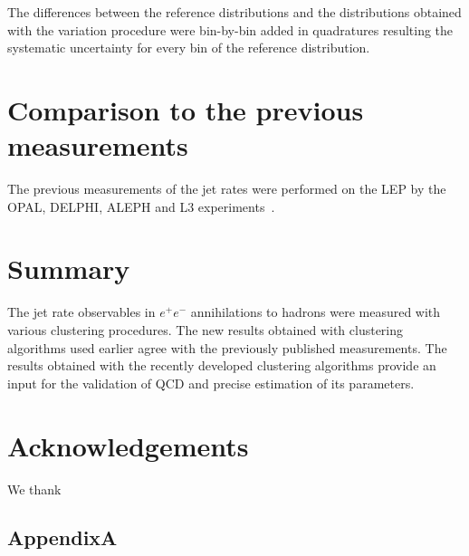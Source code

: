 The differences between the reference distributions and the distributions obtained with 
the variation procedure were bin-by-bin added in quadratures resulting the systematic uncertainty for 
every bin of the reference distribution.
 







\section{Comparison to the previous measurements}                      
\label{sec:comparison}
The previous measurements of the jet rates were performed on the LEP by 
the OPAL, DELPHI, ALEPH and L3 experiments~\cite{Alexander:1996kh,
Ackerstaff:1997kk,Acton:1992fa,Akrawy:1989rg,Heister:2003aj,Abdallah:2003xz,Achard:2004sv}.





\section{Summary}                      
\label{sec:summary}
The jet rate observables  in $e^+e^-$ 
annihilations to hadrons were measured with various clustering procedures.
The new results obtained with 
clustering algorithms  used earlier agree with the previously published measurements.
The results obtained with the recently developed clustering algorithms  
provide an input for the validation of QCD and precise estimation of its parameters.
%
\section*{Acknowledgements}
\label{sec:acknowledgements}
We thank 
\FloatBarrier
\begin{appendices}
\section{AppendixA}
\label{sec:appendixA}
\TABexample
\TABexample
\TABexample
\TABexample
\TABexample


\end{appendices}
